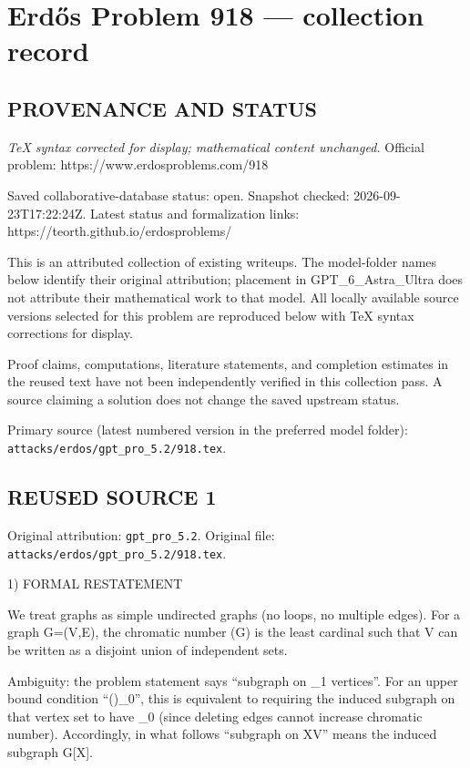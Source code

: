 \section*{Erd\H{o}s Problem 918 --- collection record}

\subsection*{PROVENANCE AND STATUS}

\emph{TeX syntax corrected for display; mathematical content unchanged.}
Official problem: https://www.erdosproblems.com/918

Saved collaborative-database status: open.
Snapshot checked: 2026-09-23T17:22:24Z.
Latest status and formalization links: https://teorth.github.io/erdosproblems/

This is an attributed collection of existing writeups. The model-folder names below identify their original attribution; placement in GPT\_6\_Astra\_Ultra does not attribute their mathematical work to that model. All locally available source versions selected for this problem are reproduced below with TeX syntax corrections for display.

Proof claims, computations, literature statements, and completion estimates in the reused text have not been independently verified in this collection pass. A source claiming a solution does not change the saved upstream status.

Primary source (latest numbered version in the preferred model folder): \texttt{attacks/erdos/gpt\_pro\_5.2/918.tex}.

\subsection*{REUSED SOURCE 1}
Original attribution: \texttt{gpt\_pro\_5.2}.
Original file: \texttt{attacks/erdos/gpt\_pro\_5.2/918.tex}.


1) FORMAL RESTATEMENT

We treat graphs as simple undirected graphs (no loops, no multiple edges).
For a graph G=(V,E), the chromatic number \chi(G) is the least cardinal \kappa such that V can be written as a disjoint union of \kappa independent sets.

Ambiguity: the problem statement says “subgraph on \aleph_1 vertices”.
For an upper bound condition “\chi(\cdot)\le\aleph_0”, this is equivalent to requiring the induced subgraph on that vertex set to have \chi\le\aleph_0 (since deleting edges cannot increase chromatic number).
Accordingly, in what follows “subgraph on X\subseteq V” means the induced subgraph G[X].

